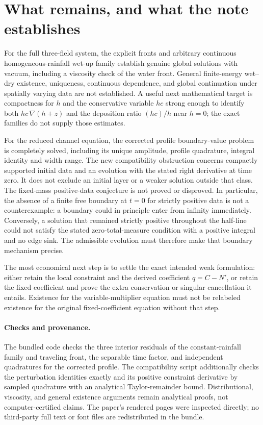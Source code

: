 \documentclass[11pt,a4paper]{article}
\theoremstyle{remark}\newtheorem{remark}[theorem]{Remark}
\begin{document}
\section{What remains, and what the note establishes}
For the full three-field system, the explicit fronts and arbitrary continuous homogeneous-rainfall wet-up family establish genuine global solutions with vacuum, including a viscosity check of the water front. General finite-energy wet--dry existence, uniqueness, continuous dependence, and global continuation under spatially varying data are not established. A useful next mathematical target is compactness for $h$ and the conservative variable $hc$ strong enough to identify both $hc\,\nabla(h+z)$ and the deposition ratio $(hc)/h$ near $h=0$; the exact families do not supply those estimates.

For the reduced channel equation, the corrected profile boundary-value problem is completely solved, including its unique amplitude, profile quadrature, integral identity and width range. The new compatibility obstruction concerns compactly supported initial data and an evolution with the stated right derivative at time zero. It does not exclude an initial layer or a weaker solution outside that class. The fixed-mass positive-data conjecture is not proved or disproved. In particular, the absence of a finite free boundary at $t=0$ for strictly positive data is not a counterexample: a boundary could in principle enter from infinity immediately. Conversely, a solution that remained strictly positive throughout the half-line could not satisfy the stated zero-total-measure condition with a positive integral and no edge sink. The admissible evolution must therefore make that boundary mechanism precise.

The most economical next step is to settle the exact intended weak formulation: either retain the local constraint and the derived coefficient $q=C-N'$, or retain the fixed coefficient and prove the extra conservation or singular cancellation it entails. Existence for the variable-multiplier equation must not be relabeled existence for the original fixed-coefficient equation without that step.

\paragraph{Checks and provenance.}
The bundled code checks the three interior residuals of the constant-rainfall family and traveling front, the separable time factor, and independent quadratures for the corrected profile. The compatibility script additionally checks the perturbation identities exactly and its positive constraint derivative by sampled quadrature with an analytical Taylor-remainder bound. Distributional, viscosity, and general existence arguments remain analytical proofs, not computer-certified claims. The paper's rendered pages were inspected directly; no third-party full text or font files are redistributed in the bundle.
\end{document}
